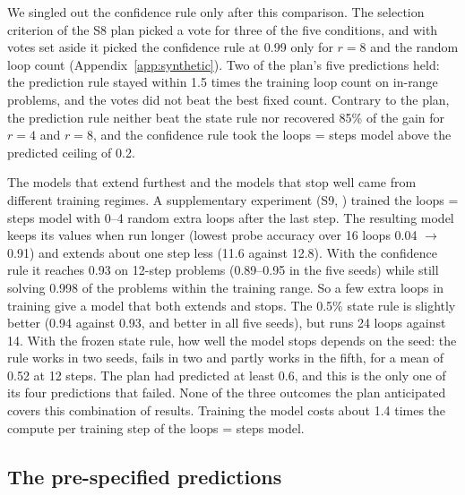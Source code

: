 We singled out the confidence rule only after this comparison. The selection criterion of the S8 plan picked a vote for
three of the five conditions, and with votes set aside it picked the confidence rule at 0.99 only for $r = 8$ and the
random loop count (Appendix~\ref{app:synthetic}). Two of the plan's five predictions held: the prediction rule stayed
within 1.5 times the training loop count on in-range problems, and the votes did not beat the best fixed count.
Contrary to the plan, the prediction rule neither beat the state rule nor recovered 85\% of the gain for $r = 4$ and
$r = 8$, and the confidence rule took the loops = steps model above the predicted ceiling of 0.2.

The models that extend furthest and the models that stop well came from different training regimes. A supplementary
experiment (S9, ) trained the loops = steps model with 0--4 random extra loops after the last step.
The resulting model keeps its values when run longer (lowest probe accuracy over 16 loops 0.04 $\rightarrow$ 0.91) and
extends about one step less (11.6 against 12.8). With the confidence rule it reaches 0.93 on 12-step problems
(0.89--0.95 in the five seeds) while still solving 0.998 of the problems within the training range. So a few extra
loops in training give a model that both extends and stops. The 0.5\% state rule is slightly better (0.94 against
0.93, and better in all five seeds), but runs 24 loops against 14. With the frozen state rule, how well the model stops
depends on the seed: the rule works in two seeds, fails in two and partly works in the fifth, for a mean of 0.52 at 12
steps. The plan had predicted at least 0.6, and this is the only one of its four predictions that failed. None of
the three outcomes the plan anticipated covers this combination of results. Training the model costs about 1.4 times
the compute per training step of the loops = steps model.

\subsection{The pre-specified predictions}
\label{sec:predictions}

